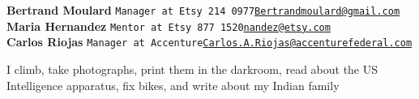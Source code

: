 \documentclass[9pt]{developercv} %
\begin{document}
    \large\textbf{Bertrand Moulard} \slashsep \large\texttt{Manager at Etsy 214 0977\slashsep\href{mailto:Bertrandmoulard@gmail.com}{Bertrandmoulard@gmail.com}}\\
    \large\textbf{Maria Hernandez} \slashsep \large\texttt{Mentor at Etsy 877 1520\slashsep\href{mailto:nandez@etsy.com}{nandez@etsy.com}}\\
    \large\textbf{Carlos Riojas} \slashsep \large\texttt{Manager at Accenture\slashsep\href{mailto:Carlos.A.Riojas@accenturefederal.com}{Carlos.A.Riojas@accenturefederal.com}}

\begin{minipage}[t]{0.45\textwidth}
    \vspace{-\baselineskip} %
    
    
    I climb, take photographs, print them in the darkroom, read about the US Intelligence apparatus, fix bikes, and write about my Indian family
\end{minipage}
\hfill
\begin{minipage}[t]{0.45\textwidth}
    \vspace{-\baselineskip} %
\end{minipage}

\end{document}
